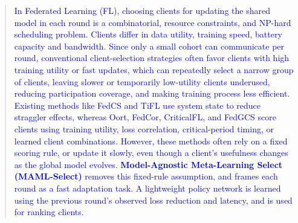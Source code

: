 \documentclass[journal]{IEEEtran}
\newcommand{\revision}[1]{\textcolor{blue}{#1}}
\begin{document}
\begin{abstract}
\revision{In Federated Learning (FL), choosing clients for updating the shared model in each round is a combinatorial,  resource constraints, and NP-hard scheduling problem. Clients differ in data utility, training speed, battery capacity and bandwidth. Since only a small cohort can communicate per round, conventional client-selection strategies often favor clients with high training utility or fast updates, which  can repeatedly select a narrow group of clients, leaving slower or temporarily low-utility clients underused, reducing participation coverage, and making training process less efficient. Existing methods like FedCS and TiFL use system state to reduce straggler effects, whereas Oort, FedCor, CriticalFL, and FedGCS score clients using training utility, loss correlation, critical-period timing, or learned client combinations. However, these methods often rely on a fixed scoring rule, or update it slowly, even though a client’s usefulness changes as the global model evolves. \textbf{Model-Agnostic Meta-Learning Select (MAML-Select)} removes this fixed-rule assumption, and frames each round as a fast adaptation task. A lightweight policy network is learned using the previous round’s observed loss reduction and latency, and is used for ranking clients. %
}
\end{abstract}
\end{document}
